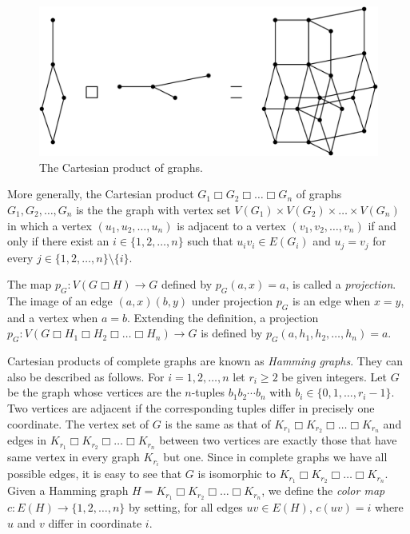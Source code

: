 \documentclass[12pt,a4paper,titlepage,openany]{report}
\begin{document}
\begin{figure}[h]
\begin{center}
\includegraphics[width=0.75\linewidth]{figures/Graph-Cartesian-product.png}
\caption{The Cartesian product of graphs.}\label{fig:cartProduct}
\end{center}
\end{figure}

More generally, the Cartesian product $G_1 \Box G_2 \Box \ldots \Box G_n$ of graphs $G_1,G_2,\ldots, G_n$ is the the graph with vertex set $V(G_1)\times V(G_2)\times \ldots \times V(G_n)$ in which a vertex $(u_1,u_2,\ldots, u_n)$ is adjacent to a vertex $(v_1,v_2,\ldots,v_n)$ if and only if there exist an $i\in \{1,2,\ldots, n\}$ such that $u_iv_i\in E(G_i)$ and $u_j=v_j$ for every $j\in \{1,2,\ldots,n\}\setminus  \{i\}$.

The map $p_G:V(G \Box H) \to G$ defined by $p_G(a,x)=a$, is called a \emph{projection}. The image of an edge $(a,x)(b,y)$ under projection $p_G$ is an edge when $x=y$, and a vertex when $a=b$. Extending the definition, a projection $p_G:V(G \Box H_1 \Box H_2 \Box \ldots \Box H_n) \to G$ is defined by $p_G(a,h_1,h_2,\ldots,h_n)=a$.


Cartesian products of complete graphs are known as \emph{Hamming graphs}. They can also be described as follows. For
$i=1,2,\ldots, n$ let $r_i\geq 2$ be given integers. Let $G$ be the graph whose vertices are the $n$-tuples $b_1b_2\cdots b_n$ with $b_i\in \{0,1,\ldots, r_i-1\}$. Two vertices are adjacent if the corresponding tuples differ in precisely one coordinate. The vertex set of $G$ is the same as that of $K_{r_1} \Box K_{r_2} \Box \ldots \Box K_{r_n}$ and edges in $K_{r_1} \Box K_{r_2} \Box \ldots \Box K_{r_n}$ between two vertices are exactly those that have same vertex in every graph $K_{r_i}$ but one. Since in complete graphs we have all possible edges, it is easy to see that $G$ is isomorphic to $K_{r_1} \Box K_{r_2} \Box \ldots \Box K_{r_n}$.
Given a Hamming graph $H=K_{r_1} \Box K_{r_2} \Box \ldots \Box K_{r_n}$, we define the \emph{color map} $c:E(H)\rightarrow \{1,2,\ldots, n\}$ by setting, for all edges $uv\in E(H)$, $c(uv)=i$ where $u$ and $v$ differ in coordinate $i$.
\end{document}
